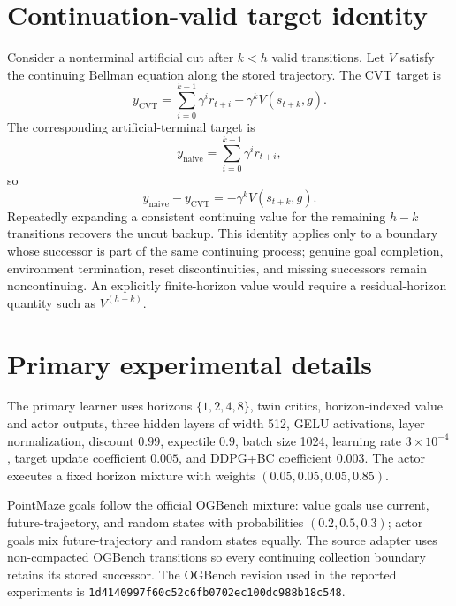 \section{Continuation-valid target identity}
\label{app:cvt}

Consider a nonterminal artificial cut after $k<h$ valid transitions. Let $V$ satisfy the continuing Bellman equation along the stored trajectory. The CVT target is
\begin{equation}
  y_{\mathrm{CVT}}
  =
  \sum_{i=0}^{k-1}\gamma^i r_{t+i}
  + \gamma^k V(s_{t+k},g).
\end{equation}
The corresponding artificial-terminal target is
\begin{equation}
  y_{\mathrm{naive}}
  =
  \sum_{i=0}^{k-1}\gamma^i r_{t+i},
\end{equation}
so
\begin{equation}
  y_{\mathrm{naive}}-y_{\mathrm{CVT}}
  =-\gamma^kV(s_{t+k},g).
\end{equation}
Repeatedly expanding a consistent continuing value for the remaining $h-k$ transitions recovers the uncut backup. This identity applies only to a boundary whose successor is part of the same continuing process; genuine goal completion, environment termination, reset discontinuities, and missing successors remain noncontinuing. An explicitly finite-horizon value would require a residual-horizon quantity such as $V^{(h-k)}$.

\section{Primary experimental details}
\label{app:details}

The primary learner uses horizons $\{1,2,4,8\}$, twin critics, horizon-indexed value and actor outputs, three hidden layers of width 512, GELU activations, layer normalization, discount $0.99$, expectile $0.9$, batch size 1024, learning rate $3\times10^{-4}$, target update coefficient $0.005$, and DDPG+BC coefficient $0.003$. The actor executes a fixed horizon mixture with weights $(0.05,0.05,0.05,0.85)$.

PointMaze goals follow the official OGBench mixture: value goals use current, future-trajectory, and random states with probabilities $(0.2,0.5,0.3)$; actor goals mix future-trajectory and random states equally. The source adapter uses non-compacted OGBench transitions so every continuing collection boundary retains its stored successor. The OGBench revision used in the reported experiments is \texttt{1d4140997f60c52c6fb0702ec100dc988b18c548}.


